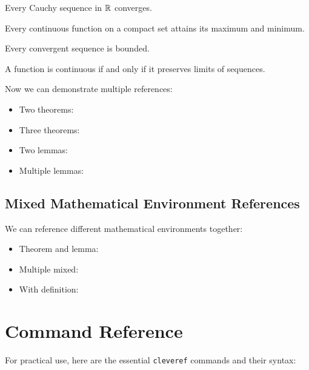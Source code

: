 \documentclass[11pt]{article}
\begin{document}
\begin{theorem}\label{thm:completeness}
Every Cauchy sequence in $\mathbb{R}$ converges.
\end{theorem}

\begin{theorem}\label{thm:existence}
Every continuous function on a compact set attains its maximum and minimum.
\end{theorem}

\begin{lemma}\label{lem:bounded}
Every convergent sequence is bounded.
\end{lemma}

\begin{lemma}\label{lem:continuity}
A function is continuous if and only if it preserves limits of sequences.
\end{lemma}

Now we can demonstrate multiple references:
\begin{itemize}
\item Two theorems: 
\item Three theorems: 
\item Two lemmas: 
\item Multiple lemmas: 
\end{itemize}

\subsection{Mixed Mathematical Environment References}

We can reference different mathematical environments together:
\begin{itemize}
\item Theorem and lemma: 
\item Multiple mixed: 
\item With definition: 
\end{itemize}

\section{Command Reference}

For practical use, here are the essential \texttt{cleveref} commands and their syntax:
\end{document}

